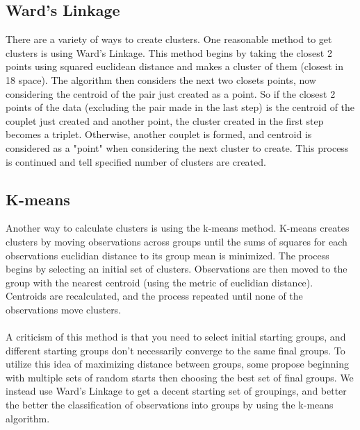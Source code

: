 \documentclass[11pt]{article}
\begin{document}
\subsection*{Ward's Linkage}
There are a variety of ways to create clusters. One reasonable method to get clusters is using Ward's Linkage. This method begins by taking the closest 2 points using squared euclidean distance and makes a cluster of them (closest in 18 space). The algorithm then considers the next two closets points, now considering the centroid of the pair just created as a point. So if the closest 2 points of the data (excluding the pair made in the last step) is the centroid of the couplet just created and another point, the cluster created in the first step becomes a triplet. Otherwise, another couplet is formed, and centroid is considered as a "point" when considering the next cluster to create. This process is continued and tell specified number of clusters are created. 

\subsection*{K-means}
Another way to calculate clusters is using the k-means method. K-means creates clusters by moving observations across groups until the sums of squares for each observations euclidian distance to its group mean is minimized. The process begins by selecting an initial set of clusters. Observations are then moved to the group with the nearest centroid (using the metric of euclidian distance). Centroids are recalculated, and the process repeated until none of the observations move clusters.  
\\
\\
A criticism of this method is that you need to select initial starting groups, and different starting groups don't necessarily converge to the same final groups. To utilize this idea of maximizing distance between groups, some propose beginning with multiple sets of random starts then choosing the best set of final groups. We instead use Ward's Linkage to get a decent starting set of groupings, and better the better the classification of observations into groups by using the k-means algorithm.
\end{document}
